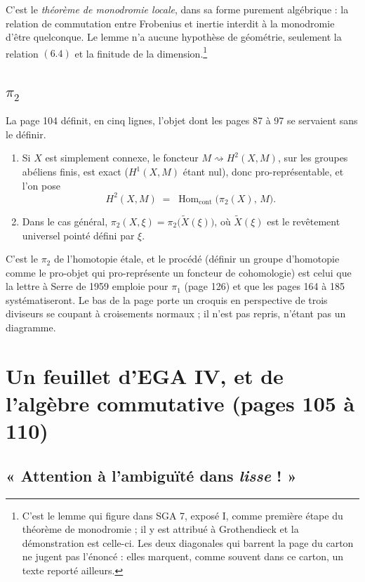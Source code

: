 \documentclass[11pt,a4paper]{article}
\begin{document}
C'est le \emph{théorème de monodromie locale}, dans sa forme purement
algébrique : la relation de commutation entre Frobenius et inertie interdit à
la monodromie d'être quelconque. Le lemme n'a aucune hypothèse de géométrie,
seulement la relation $(6.4)$ et la finitude de la
dimension.\footnote{C'est le lemme qui figure dans SGA 7, exposé I, comme
première étape du théorème de monodromie ; il y est attribué à Grothendieck et
la démonstration est celle-ci. Les deux diagonales qui barrent la page du
carton ne jugent pas l'énoncé : elles marquent, comme souvent dans ce carton,
un texte reporté ailleurs.}

\subsection*{$\pi_{2}$}

La page 104 définit, en cinq lignes, l'objet dont les pages 87 à 97 se servaient sans le définir.

\begin{enumerate}
  \item[a)] Si $X$ est simplement connexe, le foncteur
    $M \rightsquigarrow H^{2}(X, M)$, sur les groupes abéliens finis, est
    exact ($H^{1}(X, M)$ étant nul), donc pro-représentable, et l'on pose
    \[
      H^{2}(X, M) \;=\; \operatorname{Hom}_{\mathrm{cont}}
      \bigl(\pi_{2}(X),\, M\bigr) .
    \]
  \item[b)] Dans le cas général, $\pi_{2}(X, \xi) = \pi_{2}\bigl(\tilde{X}(\xi)
    \bigr)$, où $\tilde{X}(\xi)$ est le revêtement universel pointé défini par
    $\xi$.
\end{enumerate}

C'est le $\pi_{2}$ de l'homotopie étale, et le procédé (définir un groupe
d'homotopie comme le pro-objet qui pro-représente un foncteur de cohomologie)
est celui que la lettre à Serre de 1959 emploie pour $\pi_{1}$
(page 126) et que les pages 164 à 185 systématiseront. Le bas de la page porte
un croquis en perspective de trois diviseurs se coupant à croisements normaux ;
il n'est pas repris, n'étant pas un diagramme.

\section*{Un feuillet d'EGA IV, et de l'algèbre commutative (pages 105 à 110)}

\subsection*{« Attention à l'ambiguïté dans \emph{lisse} ! »}
\end{document}
